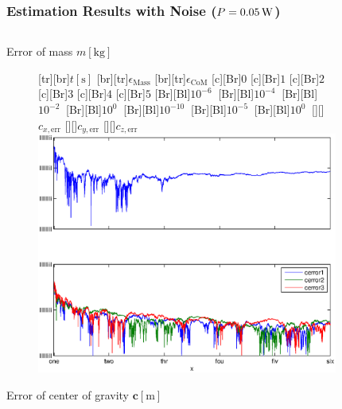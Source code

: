 \documentclass[student,noshadow]{ITRslides}
\renewcommand{\vec}[1]{\boldsymbol{#1}}
\renewcommand{\vec}[1]{\boldsymbol{#1}}
\newcommand{\scr}[1]{\mathrm{#1}}
\begin{document}
\begin{frame}
	\frametitle{Estimation Results with Noise ($P = \unit[0.05]{W}$)}
	\begin{columns}
		\centering
		\begin{column}{0.5\textwidth}
			\centering
			Error of mass $m \left[\mathrm{kg}\right]$
			\begin{figure}
				[tr][br]{$t\left[\mathrm{s}\right]$}
				[br][tr]{$\epsilon_\scr{Mass}$}
				[br][tr]{$\epsilon_\scr{CoM}$}
				[c][Br]{$0$}
				[c][Br]{$1$}
				[c][Br]{$2$}
				[c][Br]{$3$}
				[c][Br]{$4$}
				[c][Br]{$5$}
				[Br][Bl]{$10^{-6}\  $}
				[Br][Bl]{$10^{-4}\  $}
				[Br][Bl]{$10^{-2}\  $}
				[Br][Bl]{$10^0\  $}
				[Br][Bl]{$10^{-10}\  $}
				[Br][Bl]{$10^{-5}\  $}
				[Br][Bl]{$10^0\  $}
				[][]{\tiny $c_{x,\scr{err}}$}
				[][]{\tiny $c_{y,\scr{err}}$}
				[][]{\tiny $c_{z,\scr{err}}$}
				\includegraphics[width=\textwidth]{fig/mass_multi_noise.eps}
			\end{figure}
			Error of center of gravity $\vec{c} \left[\mathrm{m}\right]$
		\end{column}
		\begin{column}{0.5\textwidth}
			\centering
			\begin{figure}
				[tr][br]{$t\left[\mathrm{s}\right]$}

\end{figure}
\end{column}
\end{columns}
\end{frame}
\end{document}
